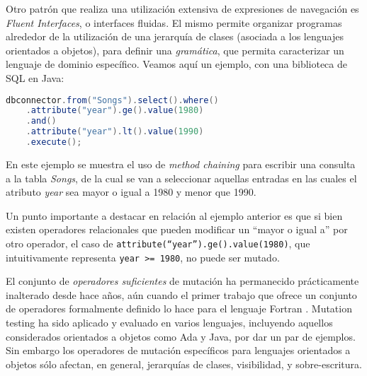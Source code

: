 Otro patr\'on que realiza una utilizaci\'on extensiva de expresiones de navegaci\'on es \emph{Fluent Interfaces}, o interfaces fluidas. El mismo permite organizar programas alrededor de la utilizaci\'on de una jerarqu\'ia de clases (asociada a los lenguajes orientados a objetos), para definir una \emph{gram\'atica}, que permita caracterizar un lenguaje de dominio espec\'ifico. Veamos aqu\'i un ejemplo, con una biblioteca de SQL en Java:
\begin{center}
	\begin{lstlisting}[mathescape=true, language=Java,basicstyle={}]
	dbconnector.from("Songs").select().where()
	.attribute("year").ge().value(1980)
	.and()
	.attribute("year").lt().value(1990)
	.execute();
	\end{lstlisting}
\end{center}
En este ejemplo se muestra el uso de \emph{method chaining} para escribir una consulta a la tabla \emph{Songs}, de la cual se van a seleccionar aquellas entradas en las cuales el atributo \emph{year} sea mayor o igual a 1980 y menor que 1990.

Un punto importante a destacar en relaci\'on al ejemplo anterior es que si bien existen operadores relacionales que pueden modificar un ``mayor o igual a'' por otro operador, el caso de \texttt{attribute(``year'').ge().value(1980)}, que intuitivamente representa \texttt{year >= 1980}, no puede ser mutado.

El conjunto de \emph{operadores suficientes} de mutaci\'on ha permanecido pr\'acticamente inalterado desde hace a\~nos, a\'un cuando el primer trabajo que ofrece un conjunto de operadores formalmente definido lo hace para el lenguaje Fortran \cite{bibliography.mutation.definitions.fortranOffut87, bibliography.mutation.definitions.fortranKing91}. Mutation testing ha sido aplicado y evaluado en varios lenguajes, incluyendo aquellos considerados orientados a objetos como Ada y Java, por dar un par de ejemplos. Sin embargo los operadores de mutaci\'on espec\'ificos para lenguajes orientados a objetos s\'olo afectan, en general, jerarqu\'ias de clases, visibilidad, y sobre-escritura. 

